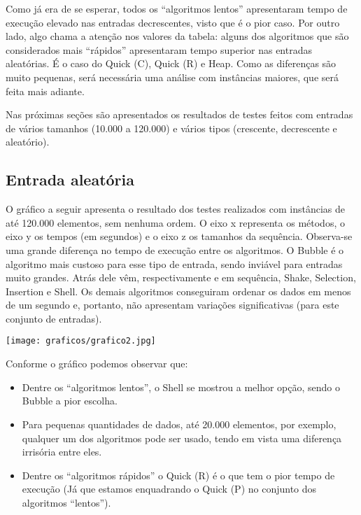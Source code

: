 \documentclass[12pt,a4paper]{article}
\begin{document}
Como já era de se esperar, todos os “algoritmos lentos” apresentaram tempo de execução elevado nas entradas decrescentes, visto que é o pior caso. Por outro lado, algo chama a atenção nos valores da tabela: alguns dos algoritmos que são considerados mais “rápidos” apresentaram tempo superior nas entradas aleatórias. É o caso do Quick (C), Quick (R) e Heap. Como as diferenças são muito pequenas, será necessária uma análise com instâncias maiores, que será feita mais adiante.

Nas próximas seções são apresentados os resultados de testes feitos com entradas de vários tamanhos (10.000 a 120.000) e vários tipos (crescente, decrescente e aleatório).






\subsection{Entrada aleatória}
O gráfico a seguir apresenta o resultado dos testes realizados com instâncias de até 120.000 elementos, sem nenhuma ordem. O eixo x representa os métodos, o eixo y os tempos (em segundos) e o eixo z os tamanhos da sequência. Observa-se uma grande diferença no tempo de execução entre os algoritmos. O Bubble é o algoritmo mais custoso para esse tipo de entrada, sendo inviável para entradas muito grandes. Atrás dele vêm, respectivamente e em sequência, Shake, Selection, Insertion e Shell. Os demais algoritmos conseguiram ordenar os dados em menos de um segundo e, portanto, não apresentam variações significativas (para este conjunto de entradas).



\begin{center}
\texttt{[image: graficos/grafico2.jpg]}
\end{center}



Conforme o gráfico podemos observar que:

\begin{itemize}
\item Dentre os “algoritmos lentos”, o Shell se mostrou a melhor opção, sendo o Bubble a pior escolha.
\item Para pequenas quantidades de dados, até 20.000 elementos, por exemplo, qualquer um dos algoritmos pode ser usado, tendo em vista uma diferença irrisória entre eles.
\item Dentre os “algoritmos rápidos” o Quick (R) é o que tem o pior tempo de execução (Já que estamos enquadrando o Quick (P) no conjunto dos algoritmos “lentos”).
\end{itemize}
\end{document}
